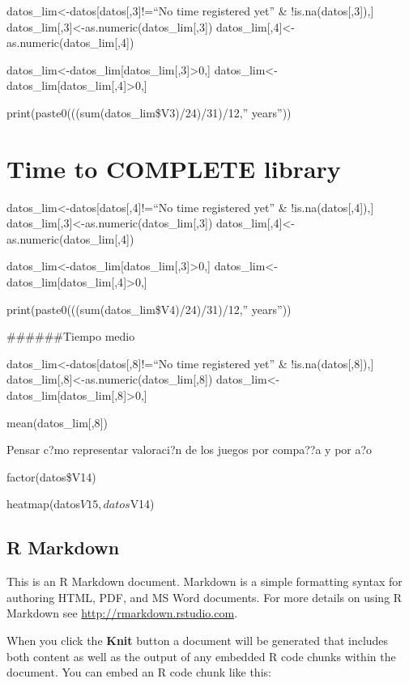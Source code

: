 \documentclass[
]{article}
\begin{document}
datos\_lim\textless-datos{[}datos{[},3{]}!=``No time registered yet'' \&
!is.na(datos{[},3{]}),{]}
datos\_lim{[},3{]}\textless-as.numeric(datos\_lim{[},3{]})
datos\_lim{[},4{]}\textless-as.numeric(datos\_lim{[},4{]})

datos\_lim\textless-datos\_lim{[}datos\_lim{[},3{]}\textgreater0,{]}
datos\_lim\textless-datos\_lim{[}datos\_lim{[},4{]}\textgreater0,{]}

print(paste0(((sum(datos\_lim\$V3)/24)/31)/12,'' years''))

\hypertarget{time-to-complete-library}{%
\section{Time to COMPLETE library}\label{time-to-complete-library}}

datos\_lim\textless-datos{[}datos{[},4{]}!=``No time registered yet'' \&
!is.na(datos{[},4{]}),{]}
datos\_lim{[},3{]}\textless-as.numeric(datos\_lim{[},3{]})
datos\_lim{[},4{]}\textless-as.numeric(datos\_lim{[},4{]})

datos\_lim\textless-datos\_lim{[}datos\_lim{[},3{]}\textgreater0,{]}
datos\_lim\textless-datos\_lim{[}datos\_lim{[},4{]}\textgreater0,{]}

print(paste0(((sum(datos\_lim\$V4)/24)/31)/12,'' years''))

\#\#\#\#\#\#Tiempo medio

datos\_lim\textless-datos{[}datos{[},8{]}!=``No time registered yet'' \&
!is.na(datos{[},8{]}),{]}
datos\_lim{[},8{]}\textless-as.numeric(datos\_lim{[},8{]})
datos\_lim\textless-datos\_lim{[}datos\_lim{[},8{]}\textgreater0,{]}

mean(datos\_lim{[},8{]})

Pensar c?mo representar valoraci?n de los juegos por compa??a y por a?o

factor(datos\$V14)

heatmap(datos\(V15,datos\)V14)

\hypertarget{r-markdown}{%
\subsection{R Markdown}\label{r-markdown}}

This is an R Markdown document. Markdown is a simple formatting syntax
for authoring HTML, PDF, and MS Word documents. For more details on
using R Markdown see \url{http://rmarkdown.rstudio.com}.

When you click the \textbf{Knit} button a document will be generated
that includes both content as well as the output of any embedded R code
chunks within the document. You can embed an R code chunk like this:
\end{document}
